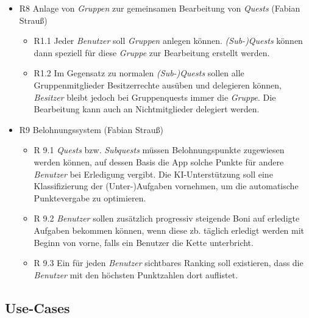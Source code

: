 \documentclass{article}
\begin{document}
\begin{itemize}
\item R8 Anlage von \textit{Gruppen} zur gemeinsamen Bearbeitung von \textit{Quests} (Fabian Strauß)
    \begin{itemize}
        \item R1.1 Jeder \textit{Benutzer} soll \textit{Gruppen} anlegen können. \textit{(Sub-)Quests} können dann speziell für diese \textit{Gruppe} zur Bearbeitung erstellt werden.
	\item R1.2 Im Gegensatz zu normalen \textit{(Sub-)Quests} sollen alle Gruppenmitglieder Besitzerrechte ausüben und delegieren können, \textit{Besitzer} bleibt jedoch bei Gruppenquests immer die \textit{Gruppe}. Die Bearbeitung kann auch an Nichtmitglieder delegiert werden.
    \end{itemize}

    
\item R9 Belohnungssystem (Fabian Strauß)
    \begin{itemize}
        \item R 9.1 \textit{Quests} bzw. \textit{Subquests} müssen Belohnungspunkte zugewiesen werden können, auf dessen Basis die App solche Punkte für andere \textit{Benutzer} bei Erledigung vergibt. Die KI-Unterstützung soll eine Klassifizierung der (Unter-)Aufgaben vornehmen, um die automatische Punktevergabe zu optimieren.
        \item R 9.2 \textit{Benutzer} sollen zusätzlich progressiv steigende Boni auf erledigte Aufgaben bekommen können, wenn diese zb. täglich erledigt werden mit Beginn von vorne, falls ein Benutzer die Kette unterbricht.
        \item R 9.3 Ein für jeden \textit{Benutzer} sichtbares Ranking soll existieren, dass die \textit{Benutzer} mit den höchsten Punktzahlen dort auflistet.
    \end{itemize}

\end{itemize}
\subsection{Use-Cases}
\end{document}
